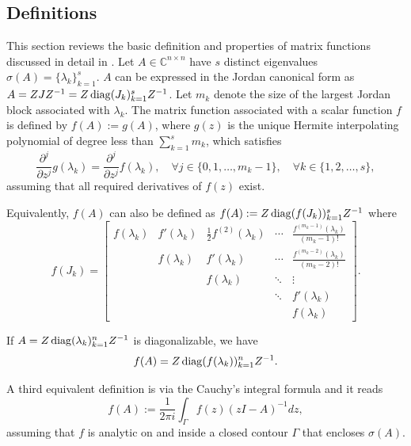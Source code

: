 \subsection{Definitions}
This section reviews the basic definition and properties of matrix functions
discussed in detail in \cite{higham2008functions}.
Let $A \in \mathbb{C}^{n \times n}$ have $s$ distinct eigenvalues $\sigma(A) = \{\lambda_k\}_{k=1}^{s}$.
$A$ can be expressed in the Jordan canonical form as $A = ZJZ^{-1} = Z \operatorname{diag}(J_k)_{k=1}^{s}
Z^{-1}$. Let $m_k$ denote the size of the largest Jordan block associated
with $\lambda_k$. The matrix function associated with a scalar function $f$
is defined by $f(A) := g(A)$, where $g(z)$ is the unique Hermite interpolating
polynomial of degree less than $\sum_{k=1}^{s}{m_k}$, which satisfies
\begin{equation}
    \frac{\partial^j}{\partial z^j}g(\lambda_k) = \frac{\partial^j}{\partial z^j}f(\lambda_k),
    \quad \forall j \in \{0, 1, \dots, m_k-1\},
    \quad \forall k \in \{1, 2, \dots, s\},
\end{equation}
assuming that all required derivatives of $f(z)$ exist.

Equivalently, $f(A)$ can also be defined as $f(A) := Z \operatorname{diag}(f(J_k))_{k=1}^{s} Z^{-1}$ where
\begin{equation*}
    f(J_k) =
    \begin{bmatrix}
    f(\lambda_k) & f'(\lambda_k)  & \frac{1}{2} f^{(2)}(\lambda_k) & \cdots & \frac{f^{(m_k-1)}(\lambda_k)}{(m_k - 1)!}\\
    & f(\lambda_k) & f'(\lambda_k) & \cdots & \frac{f^{(m_k-2)}(\lambda_k)}{(m_k - 2)!} \\
    &  & f(\lambda_k) & \ddots & \vdots \\
    &  &  & \ddots & f'(\lambda_k)\\
    &  &  &  & f(\lambda_k)
    \end{bmatrix}.
\end{equation*}

If $A = Z \operatorname{diag}(\lambda_k)_{k=1}^{n} Z^{-1}$ is diagonalizable, we have
\begin{equation}
    \label{eq:matrixfunctiondiagonal}
    f(A) = Z \operatorname{diag}(f(\lambda_k))_{k=1}^{n} Z^{-1}.
\end{equation}

A third equivalent definition is via the Cauchy's integral formula and it reads
\begin{equation}
    f(A) := \frac{1}{2 \pi i} \int_{\Gamma}{f(z)(zI - A)^{-1} dz},
\end{equation}
assuming that $f$ is analytic on and inside a closed contour $\Gamma$ that encloses $\sigma(A)$.

